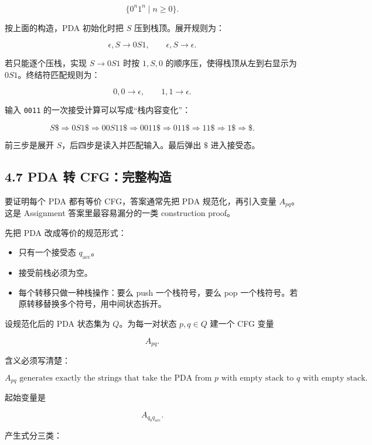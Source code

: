 ﻿\documentclass[UTF8,11pt]{ctexart}
\begin{document}
\[
\{0^n1^n\mid n\ge 0\}.
\]

按上面的构造，PDA 初始化时把 \(S\) 压到栈顶。展开规则为：

\[
\epsilon,S\to 0S1,\qquad \epsilon,S\to\epsilon.
\]

若只能逐个压栈，实现 \(S\to 0S1\) 时按 \(1,S,0\) 的顺序压，使得栈顶从左到右显示为 \(0S1\)。终结符匹配规则为：

\[
0,0\to\epsilon,\qquad 1,1\to\epsilon.
\]


输入 \texttt{0011} 的一次接受计算可以写成“栈内容变化”：

\[
S\$\Rightarrow 0S1\$\Rightarrow 00S11\$\Rightarrow 0011\$
\Rightarrow 011\$\Rightarrow 11\$\Rightarrow 1\$\Rightarrow \$.
\]

前三步是展开 \(S\)，后四步是读入并匹配输入。最后弹出 \(\$\) 进入接受态。


\subsection{4.7 PDA 转 CFG：完整构造}


要证明每个 PDA 都有等价 CFG，答案通常先把 PDA 规范化，再引入变量 \(A_{pq}\)。这是 Assignment 答案里最容易漏分的一类 construction proof。


先把 PDA 改成等价的规范形式：


\begin{itemize}
\item 只有一个接受态 \(q_{\mathrm{acc}}\)。
\item 接受前栈必须为空。
\item 每个转移只做一种栈操作：要么 push 一个栈符号，要么 pop 一个栈符号。若原转移替换多个符号，用中间状态拆开。
\end{itemize}


设规范化后的 PDA 状态集为 \(Q\)。为每一对状态 \(p,q\in Q\) 建一个 CFG 变量

\[
A_{pq}.
\]

含义必须写清楚：

\[
A_{pq}\text{ generates exactly the strings that take the PDA from }p
\text{ with empty stack to }q\text{ with empty stack}.
\]

起始变量是

\[
A_{q_0q_{\mathrm{acc}}}.
\]


产生式分三类：
\end{document}
